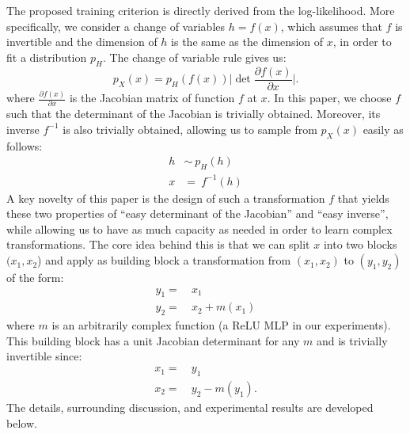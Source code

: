 \documentclass{article}
\begin{document}
The proposed training criterion is directly derived from the log-likelihood.
More specifically, we consider a change of variables $h=f(x)$,
which assumes that $f$ is invertible and the dimension of $h$ is the same
as the dimension of $x$, in order to fit a distribution $p_{H}$.
The change of variable rule gives us: 
\begin{equation}
\label{eq:change-var}
  p_X(x) = p_H(f(x)) \lvert \det \frac{\partial f(x)}{\partial x} \rvert.
\end{equation}
where $\frac{\partial f(x)}{\partial x}$ is the Jacobian matrix of function $f$ at $x$.
In this paper, we choose $f$ such that the determinant of the Jacobian is
trivially obtained. Moreover, its inverse $f^{-1}$ is also trivially obtained,
allowing us to sample from $p_X(x)$ easily as follows:
\begin{align}
\label{eq:sampling}
h &\sim~p_H(h) \nonumber \\
x & =~f^{-1}(h)
\end{align}
A key novelty of this paper is the design of such a transformation $f$
that yields these two properties of ``easy determinant of the Jacobian''
and ``easy inverse'', while allowing us to have as much capacity as needed
in order to learn complex transformations. The core idea
behind this is that we can split $x$ into two blocks $(x_1,x_2$) and
apply as building block a transformation from $(x_1,x_2)$ to $(y_1,y_2)$
of the form:
\begin{align}
  y_1=&~x_1 \nonumber \\
  y_2=&~x_2 + m(x_1)
\end{align}
where $m$ is an arbitrarily complex function (a ReLU MLP in our experiments). This building
block has a unit Jacobian determinant for any $m$ and is trivially invertible
since:
\begin{align}
   x_1 =&~ y_1 \nonumber\\
   x_2 =&~ y_2 - m(y_1).
\end{align}
The details, surrounding discussion, and experimental results
are developed below.
\end{document}

